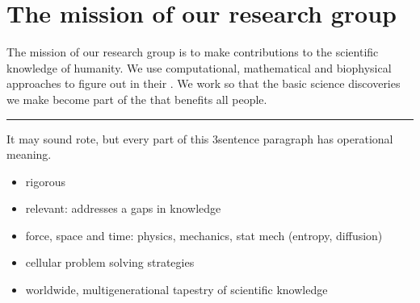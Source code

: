 \documentclass[letterpaper,10pt,english]{sphinxmanual}
\begin{document}
\section{The mission of our research group}
\label{\detokenize{01OurMission:the-mission-of-our-research-group}}
\sphinxAtStartPar
The mission of our research group is to make  contributions to the scientific knowledge of humanity.
We use computational, mathematical and biophysical approaches to figure out  in their .
We work so that the basic science discoveries we make become part of the  that benefits all people.


\bigskip\hrule\bigskip


\sphinxAtStartPar
It may sound rote, but every part of this 3\sphinxhyphen{}sentence paragraph has operational meaning.
\begin{itemize}
\item {} 
\sphinxAtStartPar
rigorous

\item {} 
\sphinxAtStartPar
relevant: addresses a gaps in knowledge

\item {} 
\sphinxAtStartPar
force, space and time: physics, mechanics, stat mech (entropy, diffusion)

\item {} 
\sphinxAtStartPar
cellular problem solving strategies

\item {} 
\sphinxAtStartPar
worldwide, multi\sphinxhyphen{}generational tapestry of scientific knowledge

\end{itemize}
\end{document}
